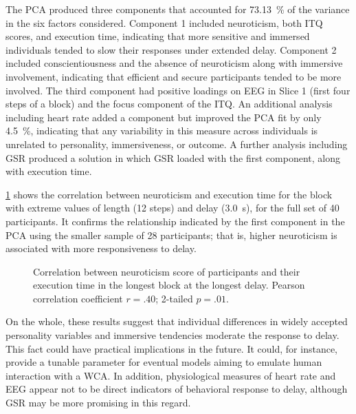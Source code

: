 The PCA produced three components that accounted for \SI{73.13}{\percent} of the variance in the six factors considered.
Component 1 included neuroticism, both ITQ scores, and execution time, indicating that more sensitive and immersed individuals tended to slow their responses under extended delay.
Component 2 included conscientiousness and the absence of neuroticism along with immersive involvement, indicating that efficient and secure participants tended to be more involved.
The third component had positive loadings on EEG in Slice 1 (first four steps of a block) and the focus component of the ITQ.\@
An additional analysis including heart rate added a component but improved the PCA fit by only \SI{4.5}{\percent}, indicating that any variability in this measure across individuals is unrelated to personality, immersiveness, or outcome.
A further analysis including GSR produced a solution in which GSR loaded with the first component, along with execution time.

\cref{fig:neuro:exectime:reg} shows the correlation between neuroticism and execution time for the block with extreme values of length (12 steps) and delay (\SI{3.0}{\second}), for the full set of 40 participants.
It confirms the relationship indicated by the first component in the PCA using the smaller sample of 28 participants; that is, higher neuroticism is associated with more responsiveness to delay.

\begin{figure}[h]
    \centering
    \caption{Correlation between neuroticism score of participants and their execution time in the longest block at the longest delay.
    Pearson correlation coefficient \( r = .40 \); 2-tailed \( p = .01 \).}
    \label{fig:neuro:exectime:reg}
\end{figure}

On the whole, these results suggest that individual differences in widely accepted personality variables and immersive tendencies moderate the response to delay.
This fact could have practical implications in the future.
It could, for instance, provide a tunable parameter for eventual models aiming to emulate human interaction with a WCA.\@
In addition, physiological measures of heart rate and EEG appear not to be direct indicators of  behavioral response to delay, although GSR may be more promising in this regard.

